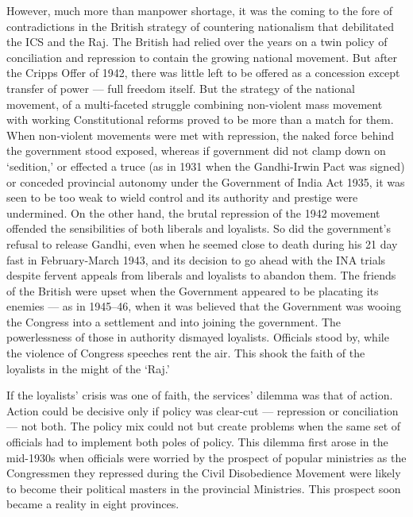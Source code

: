 However, much more than manpower shortage, it was the coming to the fore of contradictions in the British strategy of countering nationalism that debilitated the ICS and the Raj. The British had relied over the years on a twin policy of conciliation and repression to contain the growing national movement. But after the Cripps Offer of 1942, there was little left to be offered as a concession except transfer of power --- full freedom itself. But the strategy of the national movement, of a multi-faceted struggle combining non-violent mass movement with working Constitutional reforms proved to be more than a match for them. When non-violent movements were met with repression, the naked force behind the government stood exposed, whereas if government did not clamp down on `sedition,' or effected a truce (as in 1931 when the Gandhi-Irwin Pact was signed) or conceded provincial autonomy under the Government of India Act 1935, it was seen to be too weak to wield control and its authority and prestige were undermined. On the other hand, the brutal repression of the 1942 movement offended the sensibilities of both liberals and loyalists. So did the government's refusal to release Gandhi, even when he seemed close to death during his 21 day fast in February-March 1943, and its decision to go ahead with the INA trials despite fervent appeals from liberals and loyalists to abandon them. The friends of the British were upset when the Government appeared to be placating its enemies --- as in 1945--46, when it was believed that the Government was wooing the Congress into a settlement and into joining the government. The powerlessness of those in authority dismayed loyalists. Officials stood by, while the violence of Congress speeches rent the air. This shook the faith of the loyalists in the might of the `Raj.' 

If the loyalists' crisis was one of faith, the services' dilemma was that of action. Action could be decisive only if policy was clear-cut --- repression or conciliation --- not both. The policy mix could not but create problems when the same set of officials had to implement both poles of policy. This dilemma first arose in the mid-1930s when officials were worried by the prospect of popular ministries as the Congressmen they repressed during the Civil Disobedience Movement were likely to become their political masters in the provincial Ministries. This prospect soon became a reality in eight provinces. 

